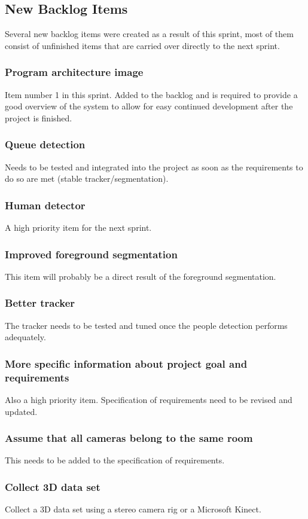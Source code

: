 \subsection{New Backlog Items}
Several new backlog items were created as a result of this sprint, most of them consist of unfinished items that are carried over directly to the next sprint.

\subsubsection{Program architecture image}
Item number 1 in this sprint. Added to the backlog and is required to provide a good overview of the system to allow for easy continued development after the project is finished.

\subsubsection{Queue detection}
Needs to be tested and integrated into the project as soon as the requirements to do so are met (stable tracker/segmentation).

\subsubsection{Human detector}
A high priority item for the next sprint.

\subsubsection{Improved foreground segmentation}
This item will probably be a direct result of the foreground segmentation.

\subsubsection{Better tracker}
The tracker needs to be tested and tuned once the people detection performs adequately.

\subsubsection{More specific information about project goal and requirements}
Also a high priority item. Specification of requirements need to be revised and updated.

\subsubsection{Assume that all cameras belong to the same room}
This needs to be added to the specification of requirements.

\subsubsection{Collect 3D data set}
Collect a 3D data set using a stereo camera rig or a Microsoft Kinect.
